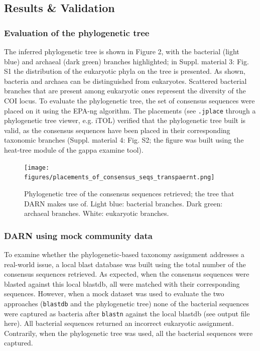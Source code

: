 \subsection{Results \& Validation}


\subsubsection*{Evaluation of the phylogenetic tree}

   The inferred phylogenetic tree is shown in Figure 2, with the bacterial (light blue) and archaeal (dark green) branches highlighted;
   in Suppl. material 3: Fig. S1 the distribution of the eukaryotic phyla on the tree is presented. 
   As shown, bacteria and archaea can be distinguished from eukaryotes. 
   Scattered bacterial branches that are present among eukaryotic ones represent the diversity of the COI locus. 
   To evaluate the phylogenetic tree, the set of consensus sequences were placed on it using the EPA-ng algorithm. 
   The placements (see \texttt{.jplace} through a phylogenetic tree viewer, e.g. iTOL) verified that the phylogenetic tree built is valid, as the consensus sequences have been placed in their corresponding taxonomic branches (Suppl. material 4: Fig. S2; the figure was built using the heat-tree module of the gappa examine tool).

   \begin{figure}[H]
      \centering
      \texttt{[image: figures/placements\_of\_consensus\_seqs\_transpaernt.png]}
      \caption{
         Phylogenetic tree of the consensus sequences retrieved; the tree that DARN makes use of. Light blue: bacterial branches. 
         Dark green: archaeal branches. White: eukaryotic branches.
      }
   \end{figure}


\newpage

\subsubsection*{DARN using mock community data}

   To examine whether the phylogenetic-based taxonomy assignment addresses a real-world issue, a local blast database was built using the total number of the consensus sequences retrieved. 
   As expected, when the consensus sequences were blasted against this local blastdb, all were matched with their corresponding sequences. 
   However, when a mock dataset was used to evaluate the two approaches (\texttt{blastdb} and the phylogenetic tree) none of the bacterial sequences were captured as bacteria after \texttt{blastn} against the local blastdb (see output file here). 
   All bacterial sequences returned an incorrect eukaryotic assignment. 
   Contrarily, when the phylogenetic tree was used, all the bacterial sequences were captured.


